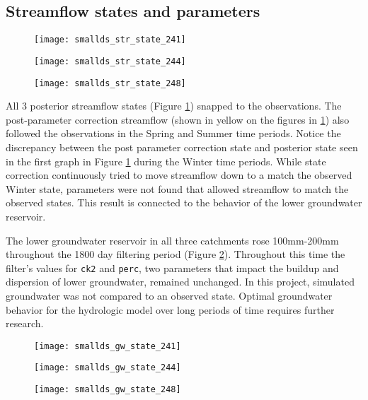 \subsection{Streamflow states and parameters}

\begin{figure}
\centering
\begin{minipage}{.33\textwidth}
  \centering
  \texttt{[image: smallds\_str\_state\_241]}
  \label{fig:241st}
\end{minipage}%
\begin{minipage}{.33\textwidth}
  \centering
  \texttt{[image: smallds\_str\_state\_244]}
  \label{fig:244st}
\end{minipage}
\begin{minipage}{.33\textwidth}
  \centering
  \texttt{[image: smallds\_str\_state\_248]}
  \label{fig:248st}
\end{minipage}
\label{fig:str_state_small}
\end{figure}

All 3 posterior streamflow states (Figure \ref{fig:str_state_small}) snapped to the observations. The post-parameter correction streamflow (shown in yellow on the figures in \ref{fig:str_state_small}) also followed the observations in the Spring and Summer time periods. Notice the discrepancy between the post parameter correction state and posterior state seen in the first graph in Figure \ref{fig:str_state_small} during the Winter time periods. While state correction continuously tried to move streamflow down to a match the observed Winter state, parameters were not found that allowed streamflow to match the observed states. This result is connected to the behavior of the lower groundwater reservoir.

The lower groundwater reservoir in all three catchments  rose 100mm-200mm throughout the 1800 day filtering period (Figure \ref{fig:gw_small}). Throughout this time the filter's values for \texttt{ck2} and \texttt{perc}, two parameters that impact the buildup and dispersion of lower groundwater, remained unchanged. In this project, simulated groundwater was not compared to an observed state. Optimal groundwater behavior for the hydrologic model over long periods of time requires further research.

\begin{figure}
\centering
\begin{minipage}{.33\textwidth}
  \centering
  \texttt{[image: smallds\_gw\_state\_241]}
  \label{fig:241gw}
\end{minipage}%
\begin{minipage}{.33\textwidth}
  \centering
  \texttt{[image: smallds\_gw\_state\_244]}
  \label{fig:244gw}
\end{minipage}
\begin{minipage}{.33\textwidth}
  \centering
  \texttt{[image: smallds\_gw\_state\_248]}
  \label{fig:248gw}
\end{minipage}
\label{fig:gw_small}
\end{figure}

